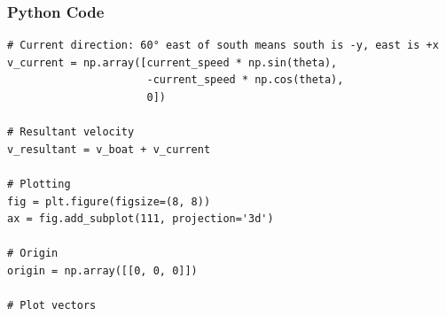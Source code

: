 \documentclass{beamer}
\begin{document}
\begin{frame}[fragile]
    \frametitle{Python Code}
    \begin{lstlisting}
# Current direction: 60° east of south means south is -y, east is +x
v_current = np.array([current_speed * np.sin(theta),
                      -current_speed * np.cos(theta),
                      0])

# Resultant velocity
v_resultant = v_boat + v_current

# Plotting
fig = plt.figure(figsize=(8, 8))
ax = fig.add_subplot(111, projection='3d')

# Origin
origin = np.array([[0, 0, 0]])

# Plot vectors

    \end{lstlisting}
\end{frame}
\end{document}
